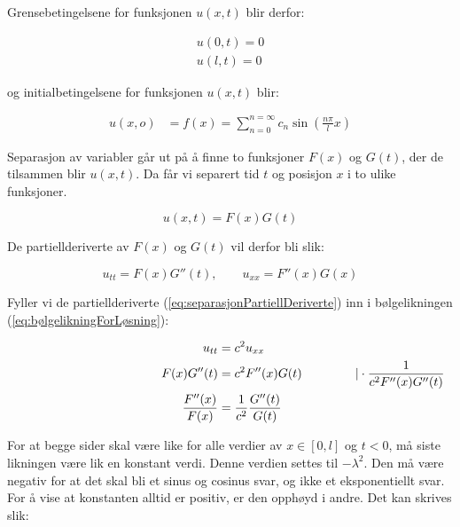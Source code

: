 Grensebetingelsene for funksjonen $u(x,t)$ blir derfor:

\begin{align}
	u(0 , t) = 0 \label{eq:grensebetingelse0}\\
	u(l , t) = 0 \label{eq:grensebetingelsel}
\end{align}

og initialbetingelsene for funksjonen $u(x,t)$ blir:

\begin{align}
	u(x , o) &= f(x) = \sum_{n=0}^{n=\infty} c_n \sin \left( \frac{n \pi}{l} x \right) 	
	\label{eq:initialbetingelse1}
\end{align}

Separasjon av variabler går ut på å finne to funksjoner $F(x)$ og $G(t)$, der de tilsammen blir $u(x , t)$. 
Da får vi separert tid $t$ og posisjon $x$ i to ulike funksjoner.

\begin{equation*}
	u(x , t) = F(x)G(t)
\end{equation*}

De partiellderiverte av $F(x)$ og $G(t)$ vil derfor bli slik:

\begin{equation}
	u_{tt} = F(x)G''(t), \qquad u_{xx} = F''(x)G(x)
	\label{eq:separasjonPartiellDeriverte}	
\end{equation}

Fyller vi de partiellderiverte (\ref{eq:separasjonPartiellDeriverte}) inn i bølgelikningen (\ref{eq:bølgelikningForLøsning}):

\begin{align*}
  \hspace{35ex}
  u_{tt} &= c^2 u_{xx} \\
  \hspace{2ex} F(x)G''(t) &= c^2 F''(x)G(t) \hspace{10ex} \vert 
  \cdot \frac{1}{c^2 F''(x) G''(t)} \\
  \frac{F''(x)}{F(x)} &= \frac{1}{c^2} \frac{G''(t)}{G(t)}
\end{align*}

For at begge sider skal være like for alle verdier av $x \in \left[ 0 , l \right]$ og $t < 0$, må siste 
likningen være lik en konstant verdi. Denne verdien settes til $- \lambda^2$. Den må være negativ for 
at det skal bli et sinus og cosinus svar, og ikke et eksponentiellt svar. For å vise at konstanten alltid 
er positiv, er den opphøyd i andre.
Det kan skrives slik:

